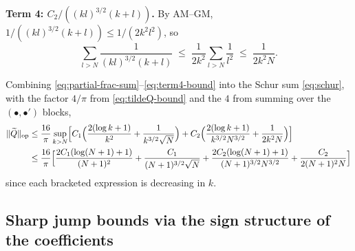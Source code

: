 \textbf{Term 4: $C_{2}/((kl)^{3/2}(k+l))$.}  By AM--GM,
$1/((kl)^{3/2}(k+l)) \leq 1/(2 k^{2} l^{2})$, so
\begin{equation}\label{eq:term4-bound}
   \sum_{l > N}\frac{1}{(kl)^{3/2}(k+l)}
   \;\leq\;
   \frac{1}{2k^{2}}\sum_{l > N}\frac{1}{l^{2}}
   \;\leq\;
   \frac{1}{2 k^{2} N}.
\end{equation}

Combining \eqref{eq:partial-frac-sum}--\eqref{eq:term4-bound} into the
Schur sum \eqref{eq:schur}, with the factor $4/\pi$ from
\eqref{eq:tildeQ-bound} and the $4$ from summing over the
$(\bullet,\bullet')$ blocks,
\begin{align}
   \|\widetilde Q\|_{\mathrm{op}}
   &\leq
   \frac{16}{\pi}\sup_{k > N}\Bigl[
        C_{1}\Bigl(\frac{2(\log k + 1)}{k^{2}} + \frac{1}{k^{3/2}\sqrt{N}}\Bigr)
        + C_{2}\Bigl(\frac{2(\log k + 1)}{k^{3/2}N^{3/2}}
                     + \frac{1}{2 k^{2} N}\Bigr)
   \Bigr]\notag\\
   &\leq
   \frac{16}{\pi}\Bigl[
       \frac{2 C_{1}(\log(N+1) + 1)}{(N+1)^{2}}
     + \frac{C_{1}}{(N+1)^{3/2}\sqrt{N}}
     + \frac{2 C_{2}(\log(N+1) + 1)}{(N+1)^{3/2}N^{3/2}}
     + \frac{C_{2}}{2(N+1)^{2} N}
   \Bigr]\label{eq:schur-final-symbolic}
\end{align}
since each bracketed expression is decreasing in $k$.

\subsection{Sharp jump bounds via the sign structure of the
coefficients}
\label{sec:jump-cancellation}


